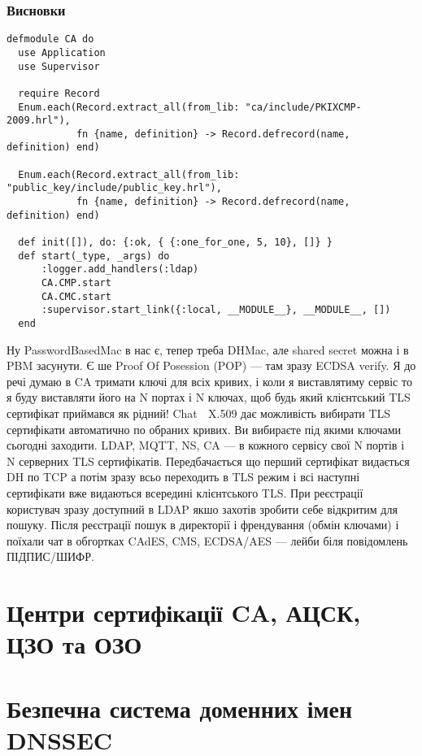 \newpage
\subsubsection{Висновки}

\begin{lstlisting}
defmodule CA do
  use Application
  use Supervisor

  require Record
  Enum.each(Record.extract_all(from_lib: "ca/include/PKIXCMP-2009.hrl"),
            fn {name, definition} -> Record.defrecord(name, definition) end)

  Enum.each(Record.extract_all(from_lib: "public_key/include/public_key.hrl"),
            fn {name, definition} -> Record.defrecord(name, definition) end)

  def init([]), do: {:ok, { {:one_for_one, 5, 10}, []} }
  def start(_type, _args) do
      :logger.add_handlers(:ldap)
      CA.CMP.start
      CA.CMC.start
      :supervisor.start_link({:local, __MODULE__}, __MODULE__, [])
  end
\end{lstlisting}

Ну PasswordBasedMac в нас є, тепер треба DHMac, але shared secret можна і в PBM засунути. Є ше Proof Of Posession (POP) — там зразу ECDSA verify. Я до речі думаю в CA тримати ключі для всіх кривих, і коли я виставлятиму сервіс то я буду виставляти його на N портах і N ключах, щоб будь який клієнтський TLS сертифікат приймався як рідний! Chat 💬 X.509 дає можливість вибирати TLS сертифікати автоматично по обраних кривих. Ви вибираєте під якими ключами сьогодні заходити. LDAP, MQTT, NS, CA — в кожного сервісу свої N портів і N серверних TLS сертифікатів. Передбачається що перший сертифікат видається DH по TCP а потім зразу всьо переходить в TLS режим і всі наступні сертифікати вже видаються всередині клієнтського TLS. При реєстрації користувач зразу доступний в LDAP якшо захотів зробити себе відкритим для пошуку. Після реєстрації пошук в директорії і френдування (обмін ключами) і поїхали чат в обгортках CAdES, CMS, ECDSA/AES — лейби біля повідомлень ПІДПИС/ШИФР.

\section{Центри сертифікації CA, АЦСК, ЦЗО та ОЗО}

\section{Безпечна система доменних імен DNSSEC}

